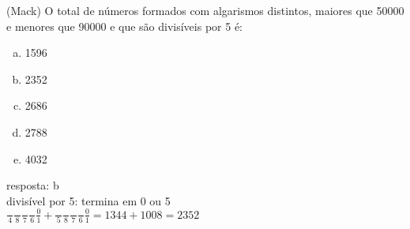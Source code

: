\begin{ex}
 	(Mack) O total de números  formados com algarismos distintos, maiores que 50000 e menores que 90000 e que são divisíveis por 5 é:
    \begin{enumerate}[(a)]
    \item 1596
    \item 2352
    \item 2686
    \item 2788
    \item 4032
    \end{enumerate}
      \begin{sol}
        resposta: b \\
        divisível por 5: termina em 0 ou 5\\
        $\frac{\phantom{A}}{4}\frac{\phantom{A}}{8}\frac{\phantom{A}}{7}\frac{\phantom{A}}{6}\frac{0}{1}+\frac{\phantom{A}}{5}\frac{\phantom{A}}{8}\frac{\phantom{A}}{7}\frac{\phantom{A}}{6}\frac{0}{1}= 1344+1008=2352$
      \end{sol}
\end{ex}